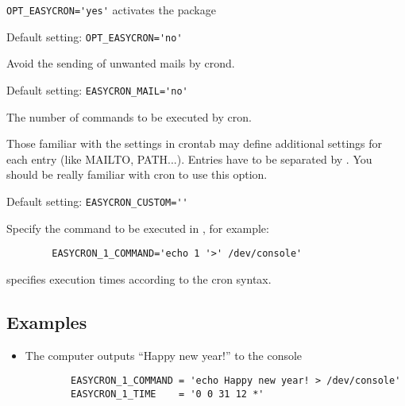 \begin{description}
 \verb*?OPT_EASYCRON='yes'? activates the package

         Default setting: \verb*?OPT_EASYCRON='no'?


         Avoid the sending of unwanted mails by crond. 

         Default setting: \verb*?EASYCRON_MAIL='no'?


         The number of commands to be executed by cron.


         Those familiar with the settings in crontab may define additional 
         settings for each entry (like MAILTO, PATH...). Entries have to be 
         separated by \var{$\backslash\backslash$}. You should be really 
         familiar with cron to use this option.

         Default setting: \verb*?EASYCRON_CUSTOM=''?


         Specify the command to be executed in ,
         for example:
\begin{example}
\begin{verbatim}
        EASYCRON_1_COMMAND='echo 1 '>' /dev/console'
\end{verbatim}
\end{example}

        specifies execution times according to the cron syntax.

\subsection{Examples}

\begin{itemize}
\item The computer outputs ``Happy new year!'' to the console
\begin{example}
\begin{verbatim}
        EASYCRON_1_COMMAND = 'echo Happy new year! > /dev/console'
        EASYCRON_1_TIME    = '0 0 31 12 *'
\end{verbatim}
\end{example}




\end{itemize}
\end{description}

